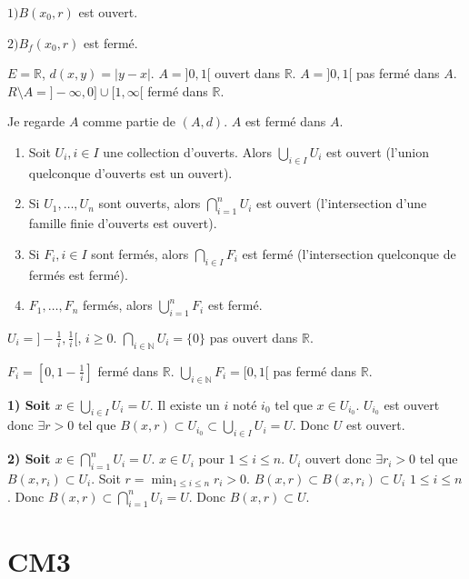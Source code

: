 \documentclass[oneside]{book}
\begin{document}
\begin{lemma}
$1) B(x_0, r)$ est ouvert.

$2) B_f(x_0, r)$ est fermé.
\end{lemma}

\begin{solution}
\end{solution}

\begin{example}
$E = \mathbb{R}$, $d(x, y) = |y - x|$.
$A = ]0, 1[$ ouvert dans $\mathbb{R}$.
$A = ]0, 1[$ pas fermé dans $A$.
$R \setminus A = ]-\infty, 0] \cup [1, \infty[$ fermé dans $\mathbb{R}$.

Je regarde $A$ comme partie de $(A, d)$.
$A$ est fermé dans $A$.
\end{example}

\begin{theorem}
\begin{enumerate}
    \item Soit $U_i, i \in I$ une collection d'ouverts. Alors $\bigcup_{i \in I} U_i$ est ouvert (l'union quelconque d'ouverts est un ouvert).
    \item Si $U_1, \dots, U_n$ sont ouverts, alors $\bigcap_{i=1}^n U_i$ est ouvert (l'intersection d'une famille finie d'ouverts est ouvert).
    \item Si $F_i, i \in I$ sont fermés, alors $\bigcap_{i \in I} F_i$ est fermé (l'intersection quelconque de fermés est fermé).
    \item $F_1, \dots, F_n$ fermés, alors $\bigcup_{i=1}^n F_i$ est fermé.
\end{enumerate}
\end{theorem}

\begin{example}
$U_i = ]-\frac{1}{i}, \frac{1}{i}[$, $i \geq 0$.
$\bigcap_{i \in \mathbb{N}} U_i = \{0\}$ pas ouvert dans $\mathbb{R}$.

$F_i = [0, 1 - \frac{1}{i}]$ fermé dans $\mathbb{R}$.
$\bigcup_{i \in \mathbb{N}} F_i = [0, 1[$ pas fermé dans $\mathbb{R}$.
\end{example}

\begin{solution}
[Dem:]
\textbf{1) Soit $x \in \bigcup_{i \in I} U_i = U$}. Il existe un $i$ noté $i_0$ tel que $x \in U_{i_0}$.
$U_{i_0}$ est ouvert donc $\exists r > 0$ tel que $B(x, r) \subset U_{i_0} \subset \bigcup_{i \in I} U_i = U$. Donc $U$ est ouvert.

\textbf{2) Soit $x \in \bigcap_{i=1}^n U_i = U$}. $x \in U_i$ pour $1 \leq i \leq n$. $U_i$ ouvert donc $\exists r_i > 0$ tel que $B(x, r_i) \subset U_i$.
Soit $r = \min_{1 \leq i \leq n} r_i > 0$.
$B(x, r) \subset B(x, r_i) \subset U_i$ $1 \leq i \leq n$.
Donc $B(x, r) \subset \bigcap_{i=1}^n U_i = U$.
Donc $B(x, r) \subset U$.
\end{solution}\chapter{CM3}
\sloppy
\end{document}
